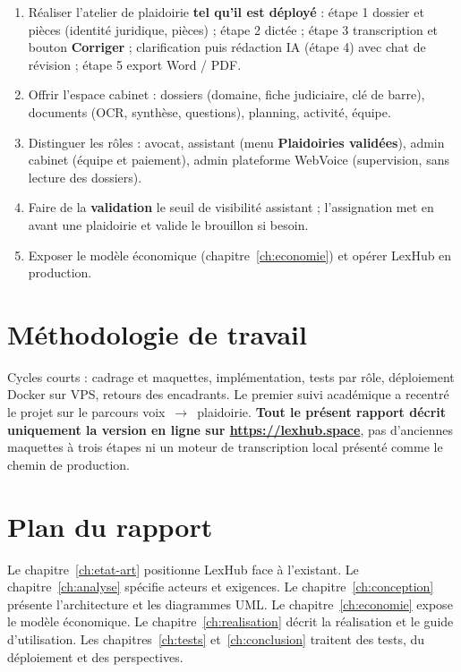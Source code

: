 \begin{enumerate}[label=\textbf{O\arabic*.}]
  \item Réaliser l'atelier de plaidoirie \textbf{tel qu'il est déployé} : étape 1 dossier et pièces (identité juridique, pièces) ; étape 2 dictée ; étape 3 transcription et bouton \textbf{Corriger} ; clarification puis rédaction IA (étape 4) avec chat de révision ; étape 5 export Word / PDF.
  \item Offrir l'espace cabinet : dossiers (domaine, fiche judiciaire, clé de barre), documents (OCR, synthèse, questions), planning, activité, équipe.
  \item Distinguer les rôles : avocat, assistant (menu \textbf{Plaidoiries validées}), admin cabinet (équipe et paiement), admin plateforme WebVoice (supervision, sans lecture des dossiers).
  \item Faire de la \textbf{validation} le seuil de visibilité assistant ; l'assignation met en avant une plaidoirie et valide le brouillon si besoin.
  \item Exposer le modèle économique (chapitre~\ref{ch:economie}) et opérer LexHub en production.
\end{enumerate}

\section{Méthodologie de travail}

Cycles courts : cadrage et maquettes, implémentation, tests par rôle, déploiement Docker sur VPS, retours des encadrants. Le premier suivi académique a recentré le projet sur le parcours voix~$\rightarrow$~plaidoirie. \textbf{Tout le présent rapport décrit uniquement la version en ligne sur \url{https://lexhub.space}}, pas d'anciennes maquettes à trois étapes ni un moteur de transcription local présenté comme le chemin de production.

\section{Plan du rapport}

Le chapitre~\ref{ch:etat-art} positionne LexHub face à l'existant. Le chapitre~\ref{ch:analyse} spécifie acteurs et exigences. Le chapitre~\ref{ch:conception} présente l'architecture et les diagrammes UML. Le chapitre~\ref{ch:economie} expose le modèle économique. Le chapitre~\ref{ch:realisation} décrit la réalisation et le guide d'utilisation. Les chapitres~\ref{ch:tests} et~\ref{ch:conclusion} traitent des tests, du déploiement et des perspectives.
